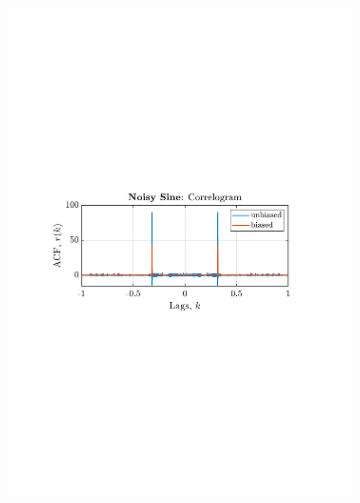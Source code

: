 \documentclass[12pt]{article}
\begin{document}
\begin{figure}[H]
\begin{subfigure}{0.49\textwidth}
			\includegraphics[trim={2.2cm 11cm 3.15cm  11.2cm}, clip, width=\textwidth]{../MATLAB/figures/q1_3a_fig04.pdf} 
		\end{subfigure}
		\begin{subfigure}{0.49\textwidth}
			\centering

\end{subfigure}
\end{figure}
\end{document}
